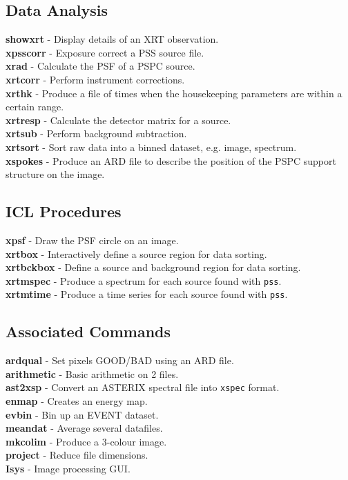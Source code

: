 \documentclass[11pt,fleqn]{article}    %
\begin{document}
\subsection{Data Analysis}
{\large \bf {showxrt}} - Display details of an XRT observation. \\
{\large \bf {xpsscorr}} - Exposure correct a PSS source file. \\
{\large \bf {xrad}} - Calculate the PSF of a PSPC source. \\
{\large \bf {xrtcorr}} - Perform instrument corrections. \\
{\large \bf {xrthk}} - Produce a file of times when the housekeeping
parameters are within a certain range. \\
{\large \bf {xrtresp}} - Calculate the detector matrix for a source. \\
{\large \bf {xrtsub}} - Perform background subtraction. \\
{\large \bf {xrtsort}} - Sort raw data into a binned dataset,
e.g. image, spectrum. \\
{\large \bf {xspokes}} - Produce an ARD file to describe the position
of the PSPC support structure on the image. \\

\subsection{ICL Procedures}

{\large \bf {xpsf}} - Draw the PSF circle on an image. \\
{\large \bf {xrtbox}} - Interactively define a source region 
for data sorting. \\
{\large \bf {xrtbckbox}} - Define a source and background region 
for data sorting. \\
{\large \bf {xrtmspec}} - Produce a spectrum for each source found
with {\tt pss}. \\
{\large \bf {xrtmtime}} - Produce a time series for each source found
with {\tt pss}. \\

\subsection{Associated Commands}

{\large \bf {ardqual}} - Set pixels GOOD/BAD using an ARD file. \\
{\large \bf {arithmetic}} - Basic arithmetic on 2 files. \\
{\large \bf {ast2xsp}} - Convert an ASTERIX spectral file into {\tt xspec} format. \\
{\large \bf {enmap}}   - Creates an energy map. \\
{\large \bf {evbin}}   - Bin up an EVENT dataset. \\
{\large \bf {meandat}} - Average several datafiles. \\
{\large \bf {mkcolim}} - Produce a 3-colour image. \\
{\large \bf {project}} - Reduce file dimensions. \\
{\large \bf {Isys}}    - Image processing GUI.\\
\end{document}
